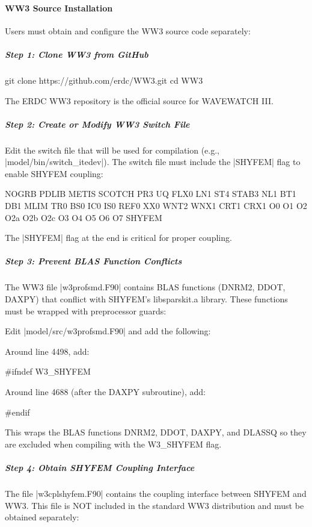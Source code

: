 \paragraph{WW3 Source Installation}

Users must obtain and configure the WW3 source code separately:

\subparagraph{Step 1: Clone WW3 from GitHub}
\begin{code}
git clone https://github.com/erdc/WW3.git
cd WW3
\end{code}

The ERDC WW3 repository is the official source for WAVEWATCH III.

\subparagraph{Step 2: Create or Modify WW3 Switch File}

Edit the switch file that will be used for compilation (e.g.,
|model/bin/switch_itedev|). The switch file must include the |SHYFEM| flag
to enable SHYFEM coupling:

\begin{code}
NOGRB PDLIB METIS SCOTCH PR3 UQ FLX0 LN1 ST4 STAB3 NL1 BT1 DB1 MLIM TR0 BS0 IC0 IS0 REF0 XX0 WNT2 WNX1 CRT1 CRX1 O0 O1 O2 O2a O2b O2c O3 O4 O5 O6 O7 SHYFEM
\end{code}

The |SHYFEM| flag at the end is critical for proper coupling.

\subparagraph{Step 3: Prevent BLAS Function Conflicts}

The WW3 file |w3profsmd.F90| contains BLAS functions (DNRM2, DDOT, DAXPY) that
conflict with SHYFEM's libsparskit.a library. These functions must be wrapped
with preprocessor guards:

Edit |model/src/w3profsmd.F90| and add the following:

Around line 4498, add:
\begin{code}
#ifndef W3_SHYFEM
\end{code}

Around line 4688 (after the DAXPY subroutine), add:
\begin{code}
#endif
\end{code}

This wraps the BLAS functions DNRM2, DDOT, DAXPY, and DLASSQ so they are
excluded when compiling with the W3\_SHYFEM flag.

\subparagraph{Step 4: Obtain SHYFEM Coupling Interface}

The file |w3cplshyfem.F90| contains the coupling interface between SHYFEM and
WW3. This file is NOT included in the standard WW3 distribution and must be
obtained separately:

